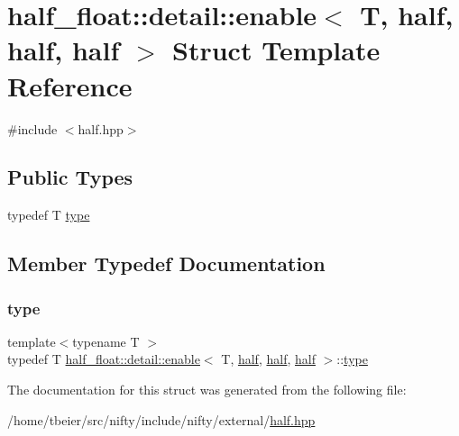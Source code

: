 \hypertarget{structhalf__float_1_1detail_1_1enable_3_01T_00_01half_00_01half_00_01half_01_4}{}\section{half\+\_\+float\+:\+:detail\+:\+:enable$<$ T, half, half, half $>$ Struct Template Reference}
\label{structhalf__float_1_1detail_1_1enable_3_01T_00_01half_00_01half_00_01half_01_4}


{\ttfamily \#include $<$half.\+hpp$>$}

\subsection*{Public Types}
\begin{DoxyCompactItemize}
\item 
typedef T \hyperlink{structhalf__float_1_1detail_1_1enable_3_01T_00_01half_00_01half_00_01half_01_4_a68d2dce4e5c5dd4472e4a0532e221de8}{type}
\end{DoxyCompactItemize}


\subsection{Member Typedef Documentation}
\mbox{\label{structhalf__float_1_1detail_1_1enable_3_01T_00_01half_00_01half_00_01half_01_4_a68d2dce4e5c5dd4472e4a0532e221de8}} 
\subsubsection{\texorpdfstring{type}{type}}
{\footnotesize\ttfamily template$<$typename T $>$ \\
typedef T \hyperlink{structhalf__float_1_1detail_1_1enable}{half\+\_\+float\+::detail\+::enable}$<$ T, \hyperlink{classhalf__float_1_1half}{half}, \hyperlink{classhalf__float_1_1half}{half}, \hyperlink{classhalf__float_1_1half}{half} $>$\+::\hyperlink{structhalf__float_1_1detail_1_1enable_3_01T_00_01half_00_01half_00_01half_01_4_a68d2dce4e5c5dd4472e4a0532e221de8}{type}}



The documentation for this struct was generated from the following file\+:\begin{DoxyCompactItemize}
\item 
/home/tbeier/src/nifty/include/nifty/external/\hyperlink{half_8hpp}{half.\+hpp}\end{DoxyCompactItemize}
